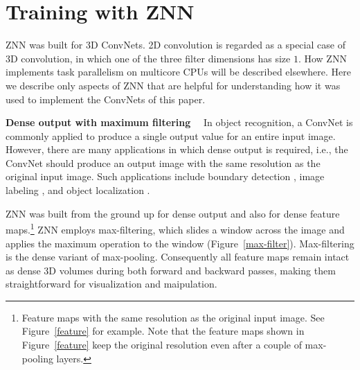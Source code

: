 \documentclass{article} %
\begin{document}


\section{Training with ZNN}
ZNN was built for 3D ConvNets. 2D convolution is regarded as a special
case of 3D convolution, in which one of the three filter dimensions
has size $1$. How ZNN implements task parallelism on multicore CPUs
will be described elsewhere. Here we describe only aspects of ZNN that are
helpful for understanding how it was used to implement the ConvNets of this paper.

{\bf Dense output with maximum filtering}$\quad$
In object recognition, a ConvNet is commonly applied to produce a
single output value for an entire input image.  However, there are
many applications in which dense output is required, i.e., the ConvNet
should produce an output image with the same resolution as the
original input image.  Such applications include boundary detection
\cite{Ciresan2012}, image labeling \cite{Long2015}, and object
localization \cite{Sermanet2014}.

ZNN was built from the ground up for dense output and also for dense
feature maps.\footnote{Feature maps with the same resolution as the original input image.
See Figure~\ref{feature} for example. Note that the feature maps shown in Figure~\ref{feature}
keep the original resolution even after a couple of max-pooling layers.}
ZNN employs max-filtering, which slides a window across
the image and applies the maximum operation to the window (Figure~\ref{max-filter}).
Max-filtering is the dense variant of max-pooling.  Consequently all
feature maps remain intact as dense 3D volumes during both forward and
backward passes, making them straightforward for visualization and maipulation.
\end{document}
